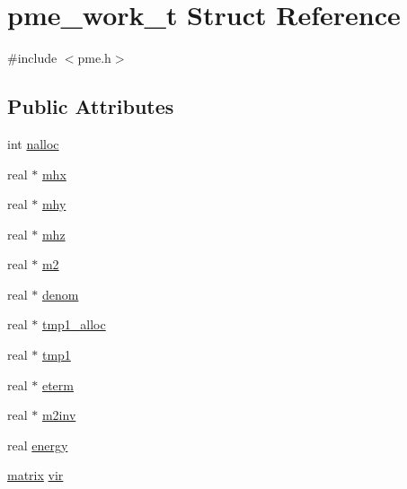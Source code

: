 \hypertarget{structpme__work__t}{\section{pme\-\_\-work\-\_\-t \-Struct \-Reference}
\label{structpme__work__t}
}


{\ttfamily \#include $<$pme.\-h$>$}

\subsection*{\-Public \-Attributes}
\begin{DoxyCompactItemize}
\item 
int \hyperlink{structpme__work__t_a918495baa1dfc9c58315b26c4e05d012}{nalloc}
\item 
real $\ast$ \hyperlink{structpme__work__t_a966a33ad6f96ecd9ae5af14fc59cd267}{mhx}
\item 
real $\ast$ \hyperlink{structpme__work__t_ad28f219640af08547ad809a3cfe0f2bd}{mhy}
\item 
real $\ast$ \hyperlink{structpme__work__t_a5b64bafb0236f1657adcbd62be2e5338}{mhz}
\item 
real $\ast$ \hyperlink{structpme__work__t_a27ccd1c58232cdc0057c49ee6a9a3436}{m2}
\item 
real $\ast$ \hyperlink{structpme__work__t_a1d79fd2f71916147be678b496da7c696}{denom}
\item 
real $\ast$ \hyperlink{structpme__work__t_a8049dbb0c845ec1127079df7db87b8ee}{tmp1\-\_\-alloc}
\item 
real $\ast$ \hyperlink{structpme__work__t_ad7603b808e36b0d4468058dd82fce5f6}{tmp1}
\item 
real $\ast$ \hyperlink{structpme__work__t_a813768b2eb8077ff4d23525f438d2f53}{eterm}
\item 
real $\ast$ \hyperlink{structpme__work__t_ae0ec3b47a2cd61eaaae2acf33c0cc4d2}{m2inv}
\item 
real \hyperlink{structpme__work__t_a1409ff313b16214daabd6d61191b78a9}{energy}
\item 
\hyperlink{share_2template_2gromacs_2types_2simple_8h_a7ea9c2a830d3f743b887387e33645a83}{matrix} \hyperlink{structpme__work__t_ae03dc273cd9e9596683ea6a8afe2945b}{vir}
\end{DoxyCompactItemize}


